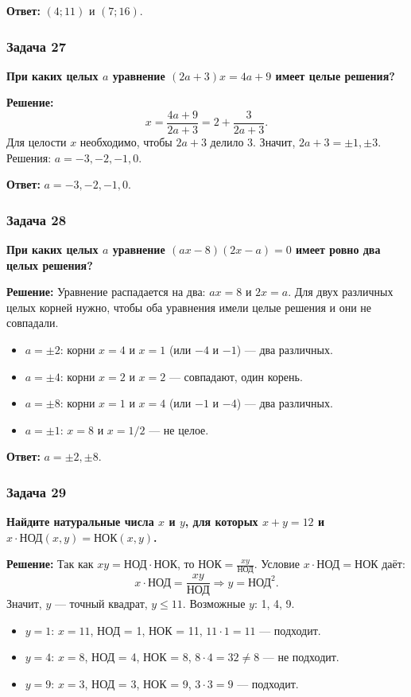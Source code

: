 \documentclass[12pt, a4paper]{article}
\begin{document}
\textbf{Ответ:} $(4; 11)$ и $(7; 16)$.

\subsubsection*{Задача 27}
\textbf{При каких целых $a$ уравнение $(2a+3)x = 4a + 9$ имеет целые решения?}

\textbf{Решение:}
\[
x = \frac{4a+9}{2a+3} = 2 + \frac{3}{2a+3}.
\]
Для целости $x$ необходимо, чтобы $2a+3$ делило 3. Значит, $2a+3 = \pm 1, \pm 3$. Решения: $a = -3, -2, -1, 0$.

\textbf{Ответ:} $a = -3, -2, -1, 0$.

\subsubsection*{Задача 28}
\textbf{При каких целых $a$ уравнение $(ax - 8)(2x - a) = 0$ имеет ровно два целых решения?}

\textbf{Решение:}
Уравнение распадается на два: $ax = 8$ и $2x = a$. Для двух различных целых корней нужно, чтобы оба уравнения имели целые решения и они не совпадали.

\begin{itemize}
    \item $a = \pm 2$: корни $x = 4$ и $x = 1$ (или $-4$ и $-1$) — два различных.
    \item $a = \pm 4$: корни $x = 2$ и $x = 2$ — совпадают, один корень.
    \item $a = \pm 8$: корни $x = 1$ и $x = 4$ (или $-1$ и $-4$) — два различных.
    \item $a = \pm 1$: $x = 8$ и $x = 1/2$ — не целое.
\end{itemize}

\textbf{Ответ:} $a = \pm 2, \pm 8$.

\subsubsection*{Задача 29}
\textbf{Найдите натуральные числа $x$ и $y$, для которых $x + y = 12$ и $x \cdot \text{НОД}(x, y) = \text{НОК}(x, y)$.}

\textbf{Решение:}
Так как $xy = \text{НОД} \cdot \text{НОК}$, то $\text{НОК} = \frac{xy}{\text{НОД}}$. Условие $x \cdot \text{НОД} = \text{НОК}$ даёт:
\[
x \cdot \text{НОД} = \frac{xy}{\text{НОД}} \Rightarrow y = \text{НОД}^2.
\]
Значит, $y$ — точный квадрат, $y \le 11$. Возможные $y$: 1, 4, 9.
\begin{itemize}
    \item $y = 1$: $x = 11$, НОД = 1, НОК = 11, $11 \cdot 1 = 11$ — подходит.
    \item $y = 4$: $x = 8$, НОД = 4, НОК = 8, $8 \cdot 4 = 32 \neq 8$ — не подходит.
    \item $y = 9$: $x = 3$, НОД = 3, НОК = 9, $3 \cdot 3 = 9$ — подходит.
\end{itemize}
\end{document}
